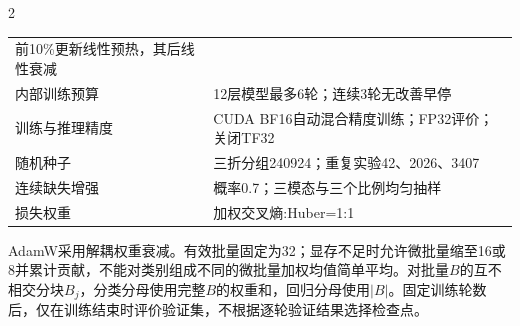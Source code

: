 \begin{PaperTable}{2}
\begin{table}[!htbp]
\begin{tabular}{@{}ll@{}}
\begin{minipage}[t]{\dimexpr 0.690000\linewidth-1.380000\tabcolsep\relax}
前10\%更新线性预热，其后线性衰减\strut
\end{minipage}\tabularnewline
\begin{minipage}[t]{\dimexpr 0.310000\linewidth-0.620000\tabcolsep\relax}\raggedright
内部训练预算\strut
\end{minipage} & \begin{minipage}[t]{\dimexpr 0.690000\linewidth-1.380000\tabcolsep\relax}\raggedright
12层模型最多6轮；连续3轮无改善早停\strut
\end{minipage}\tabularnewline
\begin{minipage}[t]{\dimexpr 0.310000\linewidth-0.620000\tabcolsep\relax}\raggedright
训练与推理精度\strut
\end{minipage} & \begin{minipage}[t]{\dimexpr 0.690000\linewidth-1.380000\tabcolsep\relax}\raggedright
CUDA BF16自动混合精度训练；FP32评价；关闭TF32\strut
\end{minipage}\tabularnewline
\begin{minipage}[t]{\dimexpr 0.310000\linewidth-0.620000\tabcolsep\relax}\raggedright
随机种子\strut
\end{minipage} & \begin{minipage}[t]{\dimexpr 0.690000\linewidth-1.380000\tabcolsep\relax}\raggedright
三折分组240924；重复实验42、2026、3407\strut
\end{minipage}\tabularnewline
\begin{minipage}[t]{\dimexpr 0.310000\linewidth-0.620000\tabcolsep\relax}\raggedright
连续缺失增强\strut
\end{minipage} & \begin{minipage}[t]{\dimexpr 0.690000\linewidth-1.380000\tabcolsep\relax}\raggedright
概率0.7；三模态与三个比例均匀抽样\strut
\end{minipage}\tabularnewline
\begin{minipage}[t]{\dimexpr 0.310000\linewidth-0.620000\tabcolsep\relax}\raggedright
损失权重\strut
\end{minipage} & \begin{minipage}[t]{\dimexpr 0.690000\linewidth-1.380000\tabcolsep\relax}\raggedright
加权交叉熵:Huber=1:1\strut
\end{minipage}\tabularnewline
\bottomrule
\end{tabular}
\end{table}

\end{PaperTable}

AdamW采用解耦权重衰减\cite{q2-ref3}。有效批量固定为32；显存不足时允许微批量缩至16或8并累计贡献，不能对类别组成不同的微批量加权均值简单平均。对批量\(B\)的互不相交分块\(B_j\)，分类分母使用完整\(B\)的权重和，回归分母使用\(|B|\)。固定训练轮数后，仅在训练结束时评价验证集，不根据逐轮验证结果选择检查点。

